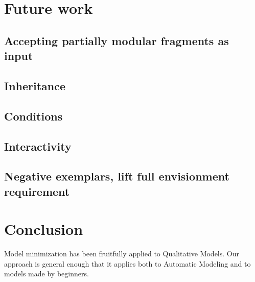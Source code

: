 \documentclass{article}
\begin{document}
\section{Future work}

\subsection{Accepting partially modular fragments as input}

\subsection{Inheritance}

\subsection{Conditions}

\subsection{Interactivity}

\subsection{Negative exemplars, lift full envisionment requirement}


\section{Conclusion}

Model minimization has been fruitfully applied to Qualitative Models. Our
approach is general enough that it applies both to Automatic Modeling and to
models made by beginners.
\end{document}
